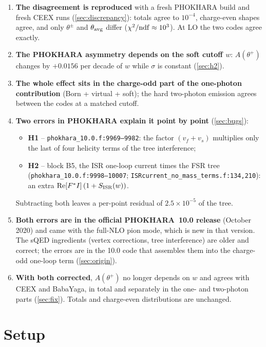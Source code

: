 \documentclass[11pt,a4paper]{article}
\newcommand{\code}[1]{\texttt{#1}}
\newcommand{\phok}{PHOKHARA}
\newcommand{\ceex}{CEEX}
\newcommand{\bby}{BabaYaga}
\newcommand{\Ath}{A(\theta^+)}
\begin{document}
\begin{enumerate}[label=\arabic*.,leftmargin=*]
\item \textbf{The disagreement is reproduced} with a fresh \phok{} build and fresh \ceex{} runs
  (\cref{sec:discrepancy}): totals agree to $10^{-4}$, charge-even shapes agree, and only
  $\theta^\pm$ and $\theta_{\rm avg}$ differ ($\chi^2/{\rm ndf}\approx 10^3$). At LO the two
  codes agree exactly.
\item \textbf{The \phok{} asymmetry depends on the soft cutoff $w$}: $\Ath$ changes by
  $+0.0156$ per decade of $w$ while $\sigma$ is constant (\cref{sec:h2}).
\item \textbf{The whole effect sits in the charge-odd part of the one-photon contribution}
  (Born + virtual + soft); the hard two-photon emission agrees between the codes
  at a matched cutoff.
\item \textbf{Two errors in \phok{} explain it point by point} (\cref{sec:bugs}):
  \begin{itemize}
  \item \textbf{H1} -- \code{phokhara\_10.0.f:9969--9982}: the factor $(v_f+v_s)$ multiplies only
    the last of four helicity terms of the tree interference;
  \item \textbf{H2} -- block B5, the ISR one-loop current times the FSR tree
    (\code{phokhara\_10.0.f:9998--10007}; \code{ISRcurrent\_no\_mass\_terms.f:134,210}):
    an extra ${\rm Re}[F^*I]\,(1+S_{\rm ISR}(w))$.
  \end{itemize}
  Subtracting both leaves a per-point residual of $2.5\times10^{-5}$ of the tree.
\item \textbf{Both errors are in the official \phok~10.0 release} (October 2020) and came with
  the full-NLO pion mode, which is new in that version. The sQED ingredients (vertex
  corrections, tree interference) are older and correct; the errors are in the 10.0 code that
  assembles them into the charge-odd one-loop term (\cref{sec:origin}).
\item \textbf{With both corrected}, $\Ath$ no longer depends on $w$ and agrees with \ceex{} and
  \bby{}, in total and separately in the one- and two-photon parts (\cref{sec:fix}). Totals and
  charge-even distributions are unchanged.
\end{enumerate}

\section{Setup}
\label{sec:setup}
\end{document}
